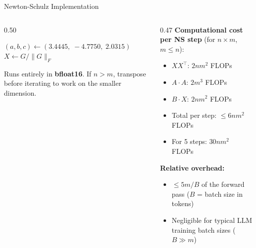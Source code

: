 \begin{frame}{Newton-Schulz Implementation}

  \begin{columns}[T]
    \begin{column}{0.50\textwidth}
      \begin{algorithm}[H]
        \small
        \caption{Newton-Schulz Orthogonalization}
        $(a, b, c) \gets (3.4445,\; -4.7750,\; 2.0315)$\;
        $X \gets G / \|G\|_F$ 
      \end{algorithm}

      \vspace{0.3em}
      {\small Runs entirely in \textbf{bfloat16}. If $n > m$, transpose before iterating to work on the smaller dimension.}
    \end{column}
    \begin{column}{0.47\textwidth}
      \textbf{Computational cost per NS step} (for $n {\times} m$, $m {\leq} n$):
      \begin{itemize}
        \item $XX^\top$: $2nm^2$ FLOPs
        \item $A \cdot A$: $2m^3$ FLOPs
        \item $B \cdot X$: $2nm^2$ FLOPs
        \item Total per step: $\leq 6nm^2$ FLOPs
        \item For 5 steps: $30nm^2$ FLOPs
      \end{itemize}

      \vspace{0.3em}
      \textbf{Relative overhead:}
      \begin{itemize}
        \item $\leq 5m/B$ of the forward pass ($B$ = batch size in tokens)
        \item Negligible for typical LLM training batch sizes ($B \gg m$)
      \end{itemize}
    \end{column}
  \end{columns}

\end{frame}

